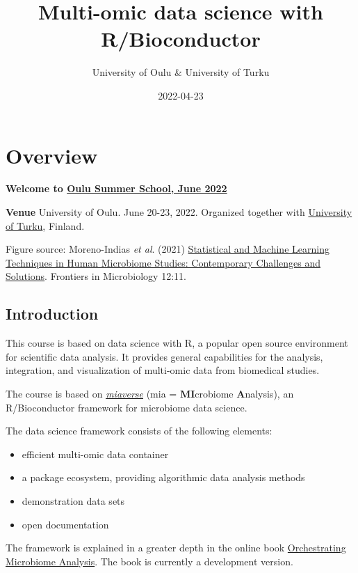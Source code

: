\documentclass[
  oneside]{book}
\title{Multi-omic data science with R/Bioconductor}
\author{University of Oulu \& University of Turku}
\date{2022-04-23}
\providecommand{\tightlist}{%
  \setlength{\itemsep}{0pt}\setlength{\parskip}{0pt}}
\begin{document}
\maketitle

{
\setcounter{tocdepth}{1}
\tableofcontents
}
\hypertarget{overview}{%
\chapter{Overview}\label{overview}}

\textbf{Welcome to \href{}{Oulu Summer School, June 2022}}

\textbf{Venue} University of Oulu. June 20-23, 2022.
Organized together with \href{http://datascience.utu.fi}{University of Turku}, Finland.

Figure source: Moreno-Indias \emph{et al}. (2021) \href{https://doi.org/10.3389/fmicb.2021.635781}{Statistical and Machine Learning Techniques in Human Microbiome Studies: Contemporary Challenges and Solutions}. Frontiers in Microbiology 12:11.

\hypertarget{introduction}{%
\section{Introduction}\label{introduction}}

This course is based on data science with R, a popular open source
environment for scientific data analysis. It provides general
capabilities for the analysis, integration, and visualization of
multi-omic data from biomedical studies.

The course is based on \href{https://microbiome.github.io}{\emph{miaverse}} (mia = \textbf{MI}crobiome \textbf{A}nalysis), an
R/Bioconductor framework for microbiome data science.

The data science framework consists of the following elements:

\begin{itemize}
\tightlist
\item
  efficient multi-omic data container
\item
  a package ecosystem, providing algorithmic data analysis methods
\item
  demonstration data sets
\item
  open documentation
\end{itemize}

The framework is explained in a greater depth in the online book
\href{https://microbiome.github.io/OMA}{Orchestrating Microbiome
Analysis}. The book is currently a
development version.
\end{document}
